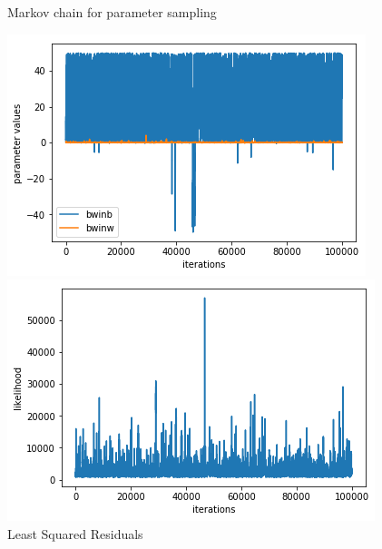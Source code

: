 \documentclass[10pt]{article}
\begin{document}
   \begin{figure}[!htb]
 \begin{minipage}{0.5\textwidth}
     \caption{Markov chain for parameter sampling}
     \centering
     \includegraphics[width=\textwidth]{mcmciter.png}
   \end{minipage}\hfill
   \begin{minipage}{0.5\textwidth}
     \caption{Least Squared Residuals}
     \centering
     \includegraphics[width=\textwidth]{mcmclike.png}
   \end{minipage}\hfill
 \end{figure}
 
\end{document}
